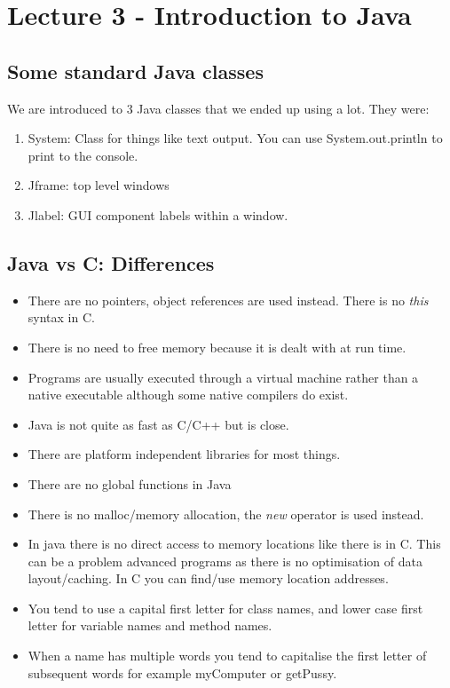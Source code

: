 \documentclass{article}
\begin{document}
\section{Lecture 3 - Introduction to Java}

\subsection{Some standard Java classes}

We are introduced to 3 Java classes that we ended up using a lot. They were:

\begin{enumerate}
\item System: Class for things like text output. You can use System.out.println to print to the console.
\item Jframe: top level windows
\item Jlabel: GUI component labels within a window.
\end{enumerate}

\subsection{Java vs C: Differences}

\begin{itemize}
\item There are no pointers, object references are used instead. There is no \emph{this} syntax in C.
\item There is no need to free memory because it is dealt with at run time.
\item Programs are usually executed through a virtual machine rather than a native executable
      although some native compilers do exist.
\item Java is not quite as fast as C/C++ but is close.
\item There are platform independent libraries for most things.
\item There are no global functions in Java
\item There is no malloc/memory allocation, the \emph{new} operator is used instead. 
\item In java there is no direct access to memory locations like there is in C. This can be a problem
      advanced programs as there is no optimisation of data layout/caching. In C you can find/use
      memory location addresses.
\item You tend to use a capital first letter for class names, and lower case first letter for variable
      names and method names.
\item When a name has multiple words you tend to capitalise the first letter of subsequent words
      for example myComputer or getPussy.
\end{itemize}
\end{document}
